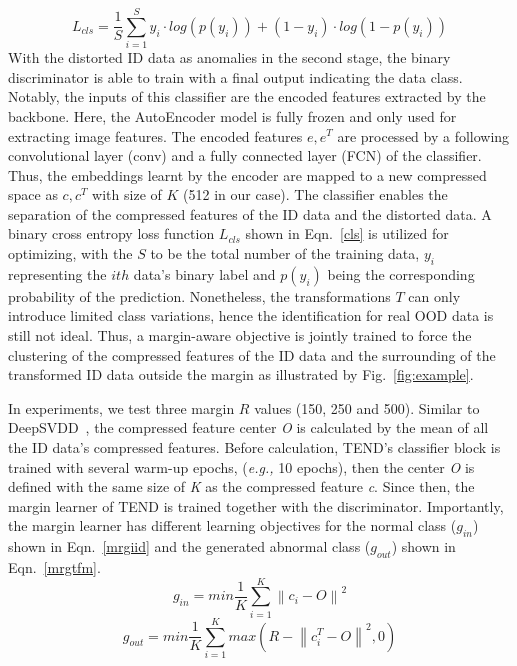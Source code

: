 \documentclass[12pt]{spieman}  %
\begin{document}
\begin{spacing}{2}
\begin{equation}\label{cls}
    L_{cls} = \frac{1}{S} \sum_{i=1}^{S} {y_{i}}\cdot log(p(y_{i})) + (1-y_{i})\cdot log(1-p(y_{i}))
\end{equation}
With the distorted ID data as anomalies in the second stage, the binary discriminator is able to train with a final output indicating the data class. Notably, the inputs of this classifier are the encoded features extracted by the backbone. Here, the AutoEncoder model is fully frozen and only used for extracting image features. The encoded features $e, e^{T}$ are processed by a following convolutional layer (conv) and a fully connected layer (FCN) of the classifier. Thus, the embeddings learnt by the encoder are mapped to a new compressed space as $c, c^{T}$ with size of $K$ (512 in our case). The classifier enables the separation of the compressed features of the ID data and the distorted data. A binary cross entropy loss function $L_{cls}$ shown in Eqn.~\ref{cls} is utilized for optimizing, with the $S$ to be the total number of the training data, $y_{i}$ representing the $ith$ data's binary label and $p(y_{i})$ being the corresponding probability of the prediction. Nonetheless, the transformations $T$ can only introduce limited class variations, hence the identification for real OOD data is still not ideal. Thus, a margin-aware objective is jointly trained to force the clustering of the compressed features of the ID data and the surrounding of the transformed ID data outside the margin as illustrated by Fig.~\ref{fig:example}. 

In experiments, we test three margin $R$ values (150, 250 and 500). Similar to DeepSVDD~\cite{ruff2018deep:ruff}, the compressed feature center \textit{O} is calculated by the mean of all the ID data's compressed features. Before calculation, TEND's classifier block is trained with several warm-up epochs, (\textit{e.g.,} 10 epochs), then the center \textit{O} is defined with the same size of \textit{K} as the compressed feature \textit{c}. Since then, the margin learner of TEND is trained together with the discriminator. Importantly, the margin learner has different learning objectives for the normal class ($g_{in}$) shown in Eqn.~\ref{mrgiid} and the generated abnormal class ($g_{out}$) shown in Eqn.~\ref{mrgtfm}. 
\begin{equation}\label{mrgiid}
g_{in}=min\frac{1}{K}\sum_{i=1}^{K}\left \|c_{i}-O  \right \|^{2}
\end{equation}
\begin{equation}\label{mrgtfm}
g_{out}=min\frac{1}{K}\sum_{i=1}^{K}max(R-\left \|c^{T}_{i}-O  \right \|^{2}, 0)
\end{equation}



\end{spacing}
\end{document}
